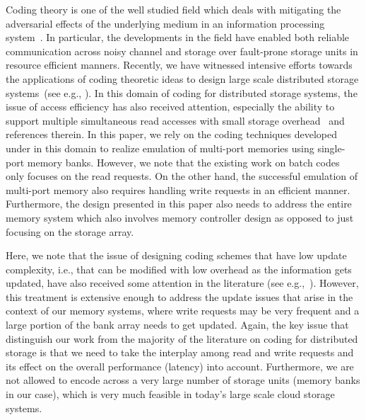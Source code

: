 Coding theory is one of the well studied field which deals with mitigating the adversarial effects of the underlying medium in an information processing system~\cite{MacSlo, Cover}. In particular, the developments in the field have enabled both reliable communication across noisy channel and storage over fault-prone storage units in resource efficient manners. Recently, we have witnessed intensive efforts towards the applications of coding theoretic ideas to design large scale distributed storage systems~(see e.g., \cite{Azure, SAPDVCB13, Rashmi14}). In this domain of coding for distributed storage systems, the issue of access efficiency has also received attention, especially the ability to support multiple simultaneous read accesses with small storage overhead~\cite{batchcodes, RPDV16, RSDG16, Wang2017} and references therein. In this paper, we rely on the coding techniques developed under in this domain to realize emulation of multi-port memories using single-port memory banks. However, we note that the existing work on batch codes~\cite{batchcodes} only focuses on the read requests. On the other hand, the successful emulation of multi-port memory also requires handling write requests in an efficient manner. Furthermore, the design presented in this paper also needs to address the entire memory system which also involves memory controller design as opposed to just focusing on the storage array. 

Here, we note that the issue of designing coding schemes that have low update complexity, i.e., that can be modified with low overhead as the information gets updated, have also received some attention in the literature (see e.g.,~\cite{ASV10, MCW14}). However, this treatment is extensive enough to address the update issues that arise in the context of our memory systems, where write requests may be very frequent and a large portion of the bank array needs to get updated. Again, the key issue that distinguish our work from the majority of the literature on coding for distributed storage is that we need to take the interplay among read and write requests and its effect on the overall performance (latency) into account. Furthermore, we  are not allowed to encode across a very large number of storage units (memory banks in our case), which is very much feasible in today's large scale cloud storage systems.

